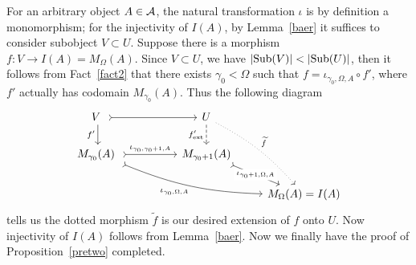 \documentclass[twoside]{article}
\begin{document}
 For an arbitrary object $A \in {\mathcal{A}}$, the natural transformation $\iota$ is by definition a monomorphism; for the injectivity of $I(A)$, by Lemma~\ref{baer} it suffices to consider subobject $V \subset U$. Suppose there is a morphism $f\colon V \rightarrow I(A) = M_\Omega (A)$. Since $V \subset U$, we have $\left|\mathrm{Sub}(V) \right| < \left|\mathrm{Sub}(U) \right|$, then it follows from Fact~\ref{fact2} that there exists $\gamma_0 < \Omega$ such that $f =  \iota_{\gamma_0, \Omega, A} \circ f'$, where $f'$ actually has codomain $M_{\gamma_0}(A)$. Thus the following diagram
$$
 \begin{tikzcd}
    V \ \ar[d, "f'"']  \ar[rr, tail] & & U \ar[d, dashed, "f'_{\mathrm{ext}}"'] \ar[ddr, dotted, bend left=10, "\widetilde{f}"] &\\
        M_{\gamma_0}(A) \ \ar[rr, tail, "\iota_{\gamma_0, \gamma_0 + 1, A}"] \ar[drrr, tail, bend right=10, "\iota_{\gamma_0, \Omega, A}"'] && M_{\gamma_0 +1}(A)  \ar[dr, tail, "\iota_{\gamma_0 + 1, \Omega, A}" description] & \\
        && & M_\Omega (A) = I(A)
\end{tikzcd}
$$
tells us the dotted morphism $\widetilde{f}$ is our desired extension of $f$ onto $U$. Now injectivity of $I(A)$ follows from Lemma~\ref{baer}.
\epf
Now we finally have the proof of Proposition~\ref{pretwo} completed.
\epf

% 

% 

\printbibliography
\end{document}
